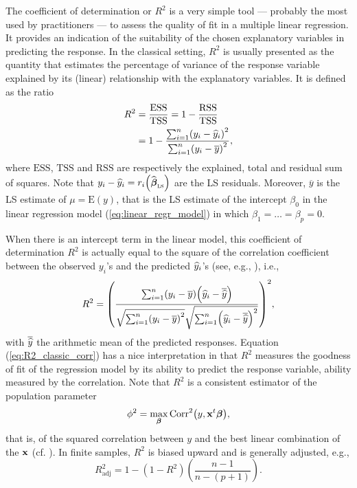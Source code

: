 The coefficient of determination or $R^{2}$ is a very simple tool --- probably
the most used by practitioners --- to assess the quality of fit in a multiple
linear regression. It provides an indication of the suitability of the chosen
explanatory variables in predicting the response. In the classical setting,
$R^{2}$ is usually presented as the quantity that estimates the percentage of
variance of the response variable explained by its (linear) relationship with
the explanatory variables. It is defined as the ratio
\begin{align}
R^{2}  &  =\frac{\mathrm{ESS}}{\mathrm{TSS}}=1-\frac{\mathrm{RSS}%
}{\mathrm{TSS}}\nonumber\\
&  =1-\frac{\sum_{i=1}^{n}\left(  y_{i}-\sthat{y}_{i}\right)  ^{2}}%
{\sum_{i=1}^{n}\left(  y_{i}-\overline{y}\right)  ^{2}},
\label{eq:R2_classic_SS}%
\end{align}
where $\mathrm{ESS}$, $\mathrm{TSS}$ and $\mathrm{RSS}$ are respectively the
explained, total and residual sum of squares. Note that $y_{i}-\sthat{y}%
_{i}=r_{i}\left(  \sthat{\boldsymbol\beta}_{\stsc{LS}}\right)  $ are the
LS residuals. Moreover, $\overline{y}$ is the LS estimate of $\mu
=\mathrm{E}(y)$, that is the LS estimate of the intercept $\beta_{0}$ in the
linear regression model (\ref{eq:linear_regr_model}) in which $\beta
_{1}=\ldots=\beta_{p}=0$.

When there is an intercept term in the linear model, this coefficient of
determination $R^{2}$ is actually equal to the square of the correlation
coefficient between the observed $y_{i}$'s and the predicted $\sthat{y}_{i}%
$'s (see, e.g., \citealp{Greene:1997}), i.e.,%
\begin{equation}
R^{2}=\left(  \frac{\sum_{i=1}^{n}\left(  y_{i}-\overline{y}\right)  \left(
\sthat{y}_{i}-\overline{\sthat{y}}\right)  }{\sqrt{\sum_{i=1}^{n}\left(
y_{i}-\overline{y}\right)  ^{2}}\sqrt{\sum_{i=1}^{n}\left(  \sthat{y}%
_{i}-\overline{\sthat{y}}\right)  ^{2}}}\right)  ^{2},
\label{eq:R2_classic_corr}%
\end{equation}
with $\overline{\widehat{y}}$ the arithmetic mean of the predicted responses.
Equation (\ref{eq:R2_classic_corr}) has a nice interpretation in that $R^{2}$
measures the goodness of fit of the regression model by its ability to predict
the response variable, ability measured by the correlation. Note that $R^{2}$
is a consistent estimator of the population parameter
\begin{equation}
\phi^{2}=\max_{\boldsymbol\beta}\mathrm{Corr}^{2}\left(  y,\stvec{x}%
^{t}\boldsymbol\beta\right)  , \label{eq:phi2}%
\end{equation}
that is, of the squared correlation between $y$ and the best linear
combination of the $\mathbf x$ (cf. \citealp{Anderson:1984}). In finite
samples, $R^{2}$ is biased upward and is generally adjusted, e.g.,
\begin{equation}
R_{\mathrm{adj}}^{2}=1-\left(  1-R^{2}\right)  \left(  \frac{n-1}{n-\left(
p+1\right)  }\right)  . \label{eq:R2_adj}%
\end{equation}


